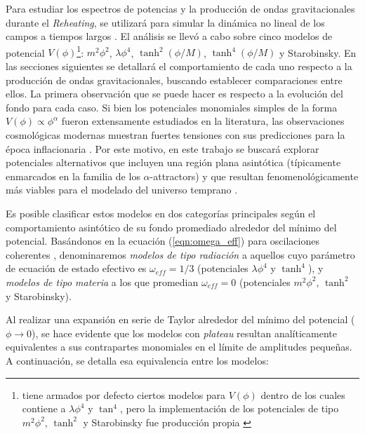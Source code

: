 Para estudiar los espectros de potencias y la producción de ondas gravitacionales durante el \textit{Reheating}, se utilizará \CosmoLattice para simular la dinámica no lineal de los campos a tiempos largos \cite{Figueroa2021, Figueroa2023}. El análisis se llevó a cabo sobre cinco modelos de potencial $V(\phi)$\footnote{\CosmoLattice tiene armados por defecto ciertos modelos para $V(\phi)$ dentro de los cuales contiene a $\lambda \phi^4$ y $\tan^4$, pero la implementación de los potenciales de tipo $m^2 \phi^2$, $\tanh^2$ y Starobinsky fue producción propia \cite{Git}}: $m^2 \phi^2$, $\lambda \phi^4$, $\tanh^2(\phi/M)$, $\tanh^4(\phi/M)$ y Starobinsky. En las secciones siguientes se detallará el comportamiento de cada uno respecto a la producción de ondas gravitacionales, buscando establecer comparaciones entre ellos. La primera observación que se puede hacer es respecto a la evolución del fondo para cada caso. Si bien los potenciales monomiales simples de la forma $V(\phi) \propto \phi^\alpha$ fueron extensamente estudiados en la literatura, las observaciones cosmológicas modernas muestran fuertes tensiones con sus predicciones para la época inflacionaria \cite{Planck, Ellis_2026}. Por este motivo, en este trabajo se buscará explorar potenciales alternativos que incluyen una región plana asintótica (típicamente enmarcados en la familia de los $\alpha$-attractors) y que resultan fenomenológicamente más viables para el modelado del universo temprano \cite{Kallosh_2013, Starobinsky_1980, Ellis_2026}.

Es posible clasificar estos modelos en dos categorías principales según el comportamiento asintótico de su fondo promediado alrededor del mínimo del potencial. Basándonos en la ecuación (\ref{eqn:omega_eff}) para oscilaciones coherentes \cite{Turner_1983}, denominaremos \textit{modelos de tipo radiación} a aquellos cuyo parámetro de ecuación de estado efectivo es $\omega_{eff} = 1/3$ (potenciales $\lambda \phi^4$ y $\tanh^4$), y \textit{modelos de tipo materia} a los que promedian $\omega_{eff} = 0$ (potenciales $m^2 \phi^2$, $\tanh^2$ y Starobinsky).

Al realizar una expansión en serie de Taylor alrededor del mínimo del potencial ($\phi \to 0$), se hace evidente que los modelos con \textit{plateau} resultan analíticamente equivalentes a sus contrapartes monomiales en el límite de amplitudes pequeñas. A continuación, se detalla esa equivalencia entre los modelos:

